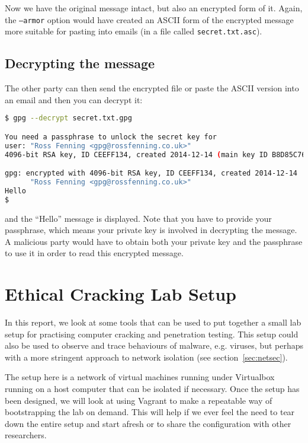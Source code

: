 \documentclass{report}
\begin{document}
Now we have the original message intact, but also an encrypted form of it.
Again, the \texttt{--armor} option would have created an ASCII form of
the encrypted message more suitable for pasting into emails (in a file
called \texttt{secret.txt.asc}).

\section{Decrypting the message}

The other party can then send the encrypted file or paste the ASCII version into
an email and then you can decrypt it:

\begin{lstlisting}[language=bash]
$ gpg --decrypt secret.txt.gpg

You need a passphrase to unlock the secret key for
user: "Ross Fenning <gpg@rossfenning.co.uk>"
4096-bit RSA key, ID CEEFF134, created 2014-12-14 (main key ID B8D85C76)

gpg: encrypted with 4096-bit RSA key, ID CEEFF134, created 2014-12-14
      "Ross Fenning <gpg@rossfenning.co.uk>"
Hello
$
\end{lstlisting}

\noindent and the ``Hello'' message is displayed. Note that you have to
provide your passphrase, which means your private key is involved in
decrypting the message. A malicious party would have to obtain both
your private key and the passphrase to use it in order to read this
encrypted message.

\chapter{Ethical Cracking Lab Setup}

In this report, we look at some tools that can be used to put together
a small lab setup for practising computer cracking and penetration
testing. This setup could also be used to observe and trace behaviours
of malware, e.g. viruses, but perhaps with a more stringent approach
to network isolation (see section~\ref{sec:netsec}).

The setup here is a network of virtual machines running under Virtualbox
running on a host computer that can be isolated if necessary. Once the
setup has been designed, we will look at using Vagrant to make a repeatable
way of bootstrapping the lab on demand. This will help if we ever feel the
need to tear down the entire setup and start afresh or to share the
configuration with other researchers.
\end{document}

